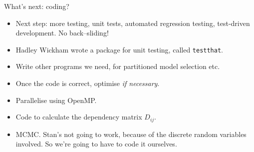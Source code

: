 \documentclass{beamer}
\begin{document}
\begin{frame}{What's next: coding?}
\begin{itemize}
\item Next step: more testing, unit tests, automated regression testing, test-driven development. No 
			back--sliding!
\item Hadley Wickham wrote a package for unit testing, called \texttt{testthat}.
\item Write other programs we need, for partitioned model selection etc.
\item Once the code is correct, optimise \emph{if necessary}.
\item Parallelise using OpenMP.
\item Code to calculate the dependency matrix $D_{ij}$.
\item MCMC. Stan's not going to work, because of the discrete random variables involved. So we're going to 
			have to code it ourselves.
\end{itemize}
\end{frame}
\end{document}
